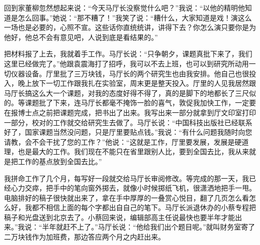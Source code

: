 \documentclass[12pt,oneside]{book}
\begin{document}
回到家董柳忽然想起来说：``今天马厅长没察觉什么吧？''我说：``以他的精明他知道是怎么回事。''她说：``那不糟了！''我笑了说：``糟什么，大家知道是戏！演这么一场也是必要的，心照不宣。这些话你直统统讲，讲得下去？你怎么演只要你是为他好，他总不会有意见吧，人说到底是看结果的。''

把材料报了上去，我就着手工作。马厅长说：``只争朝夕，课题真批下来了，我们这里已经做完了。''他跟袁震海打了招呼，我可以不去上班，也可以到研究所动用一切仪器设备。厅里批了三万块钱，马厅长的两个研究生也由我安排。他自己也很投入，晚上放下一切工作跟我扎在实验室，周末更是整天投入。厅里的人见我居然跟马厅长搞这么大一个课题，对我的态度好得不得了，真的是脚下的地都长了三尺似的。等课题批了下来，连马厅长都毫不掩饰一脸的喜气，敦促我加快工作，一定要在报博士点之前把课题完成，把书出了出来。我写出来一部分就拿到厅文印室打印一部分，校对的工作就交给研究生去做了。马厅长说：``中国科技出版社已经联系好了，国家课题当然没问题，只是厅里要贴点钱。''我说：``有什么问题我随时向您请教，会不会干扰了您的工作？''他说：``这就是工作，厅里要发展，发展是硬道理，也是最大的工作。我们现在不能只在省里跟别人比，要到全国去比，我从来就是把工作的基点放到全国去比。''

我拼命工作了几个月，每写好一段就交给马厅长审阅修改。等完成的那一天，我已经心力交瘁，把手中的笔向窗外掷去，就像小时候掷纸飞机，很潇洒地把手一甩。电脑排好的稿子很快就出来了，拿在手中厚厚的一叠赏心悦目，翻了几页怎么看怎么好，我都不相信上面的每个字都出自自己的笔下。马厅长派退休办的小蔡专程把稿子和光盘送到北京去了。小蔡回来说，编辑部高主任说最快也要半年才能出来。''我说：``半年就赶不上了。''马厅长说：``他给我们出个题目呢。''就叫财务室寄了二万块钱作为加班费，那边答应两个月之内赶出来。
\end{document}
